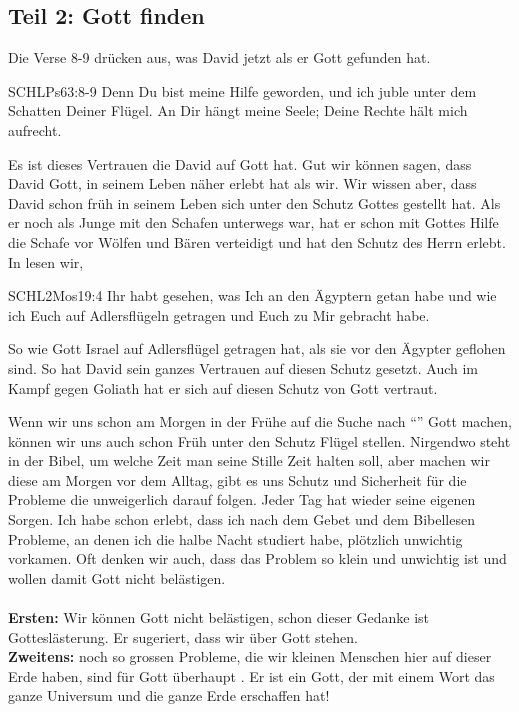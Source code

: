 \documentclass[14pt]{../../inc/mybib}
\begin{document}
    \subsection*{Teil 2: Gott finden}
    \begin{block}
        Die Verse 8-9 drücken aus, was David jetzt als er Gott gefunden hat.
        \begin{bibelbox}{SCHL}{Ps}{63:8-9}
            Denn Du bist meine Hilfe geworden, und ich juble unter dem Schatten Deiner Flügel. An Dir hängt meine Seele; Deine Rechte hält mich aufrecht.
        \end{bibelbox}
        Es ist dieses Vertrauen die David auf Gott hat. Gut wir können sagen, dass David Gott, in seinem Leben näher erlebt hat als wir. Wir wissen aber, dass David schon früh in seinem Leben sich unter den Schutz Gottes gestellt hat. Als er noch als Junge mit den Schafen unterwegs war, hat er schon mit Gottes Hilfe die Schafe vor Wölfen und Bären verteidigt und hat den Schutz des Herrn erlebt.
        In lesen wir,
        \begin{bibelbox}{SCHL}{2Mos}{19:4}
            Ihr habt gesehen, was Ich an den Ägyptern getan habe und wie ich Euch auf Adlersflügeln getragen und Euch zu Mir gebracht habe.
        \end{bibelbox}
         So wie Gott Israel auf Adlersflügel getragen hat, als sie vor den Ägypter geflohen sind. So hat David sein ganzes Vertrauen auf diesen Schutz gesetzt. Auch im Kampf gegen Goliath hat er sich auf diesen Schutz von Gott vertraut. 
    \end{block}
    \begin{block}
        Wenn wir uns schon am Morgen in der Frühe auf die Suche nach \enquote{} Gott machen, können wir uns auch schon Früh unter den Schutz  Flügel stellen. Nirgendwo steht in der Bibel, um welche Zeit man seine Stille Zeit halten soll, aber machen wir diese am Morgen vor dem Alltag, gibt es uns Schutz und Sicherheit für die Probleme die unweigerlich darauf folgen. Jeder Tag hat wieder seine eigenen Sorgen. 
        Ich habe schon erlebt, dass ich nach dem Gebet und dem Bibellesen Probleme, an denen ich die halbe Nacht studiert habe, plötzlich unwichtig vorkamen. Oft denken wir auch, dass das Problem so klein und unwichtig ist und wollen damit Gott nicht belästigen.\\        
         \\        
        \textbf{Ersten:} Wir können Gott nicht belästigen, schon dieser Gedanke ist Gotteslästerung. Er sugeriert, dass wir über Gott stehen. \\        
        \textbf{Zweitens:}  noch so grossen Probleme, die wir kleinen Menschen hier auf dieser Erde haben, sind für Gott überhaupt . Er ist ein Gott, der mit einem Wort das ganze Universum und die ganze Erde erschaffen hat!
    \end{block}
\end{document}
